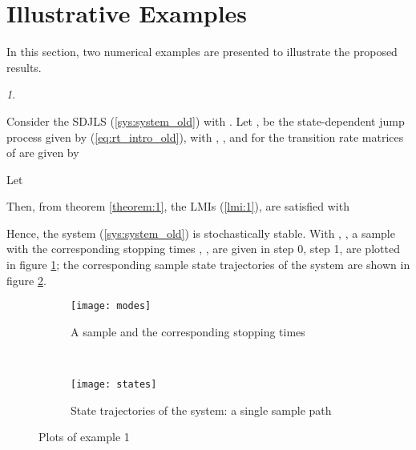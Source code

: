 \documentclass[10.5pt,a4paper]{article}
\theoremstyle{remark}
\newtheorem{example}{\protect\examplename}
\theoremstyle{plain}
\theoremstyle{plain}
\theoremstyle{remark}
\theoremstyle{plain}
\theoremstyle{plain}
\providecommand{\examplename}{Example}
\begin{document}
\section{Illustrative Examples}\label{section:examples} 
In this section, two numerical examples
are presented to illustrate the proposed results.\\
\begin{example}\label{example:1}


\noindent Consider the SDJLS (\ref{sys:system_old})
with . Let
, be the state-dependent jump process given
by (\ref{eq:rt_intro_old}), with ,
,
and for  the transition rate matrices of 
are given by


Let 

Then, from theorem \ref{theorem:1}, the LMIs (\ref{lmi:1}), are
satisfied with
 
Hence, the system (\ref{sys:system_old}) is stochastically stable.
With , , a sample  with
the corresponding stopping times , , 
are given in step 0, step 1, are plotted in figure \ref{fig:rt};
the corresponding sample state trajectories of the system are shown
in figure \ref{fig:states}.



\begin{figure}[h]
        \centering
        \begin{subfigure}[b]{0.45\textwidth}
                \texttt{[image: modes]}
				\caption{A sample  and the corresponding stopping times }
               \label{fig:rt} 
        \end{subfigure}~ \begin{subfigure}[b]{0.45\textwidth}
                \texttt{[image: states]}
				\caption{State trajectories of the system: a single sample path }
                \label{fig:states}
        \end{subfigure}
\caption{Plots of example 1 }\label{fig:example1}
\end{figure}
\end{example}
\end{document}
